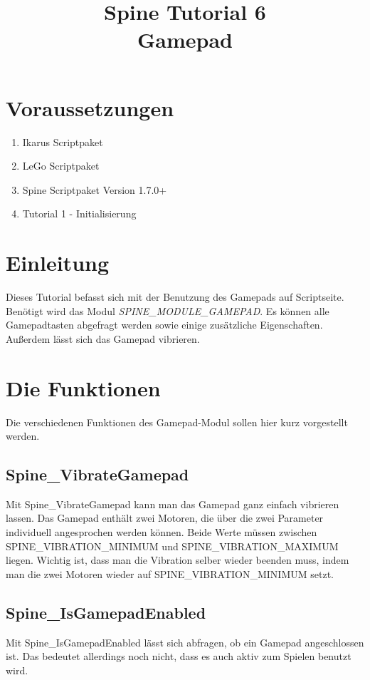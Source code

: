 \documentclass{article}
\title{Spine Tutorial 6 \\ Gamepad}
\begin{document}
\section{Voraussetzungen}

\begin{enumerate}
\item Ikarus Scriptpaket
\item LeGo Scriptpaket
\item Spine Scriptpaket Version 1.7.0+
\item Tutorial 1 - Initialisierung
\end{enumerate}

\section{Einleitung}

Dieses Tutorial befasst sich mit der Benutzung des Gamepads auf Scriptseite. Benötigt wird das Modul \textit{SPINE\_MODULE\_GAMEPAD}. Es können alle Gamepadtasten abgefragt werden sowie einige zusätzliche Eigenschaften. Außerdem lässt sich das Gamepad vibrieren.

\section{Die Funktionen}

Die verschiedenen Funktionen des Gamepad-Modul sollen hier kurz vorgestellt werden.

\subsection{Spine\_VibrateGamepad}

Mit Spine\_VibrateGamepad kann man das Gamepad ganz einfach vibrieren lassen. Das Gamepad enthält zwei Motoren, die über die zwei Parameter individuell angesprochen werden können. Beide Werte müssen zwischen SPINE\_VIBRATION\_MINIMUM und SPINE\_VIBRATION\_MAXIMUM liegen. Wichtig ist, dass man die Vibration selber wieder beenden muss, indem man die zwei Motoren wieder auf SPINE\_VIBRATION\_MINIMUM setzt.

\subsection{Spine\_IsGamepadEnabled}

Mit Spine\_IsGamepadEnabled lässt sich abfragen, ob ein Gamepad angeschlossen ist. Das bedeutet allerdings noch nicht, dass es auch aktiv zum Spielen benutzt wird.
\end{document}
